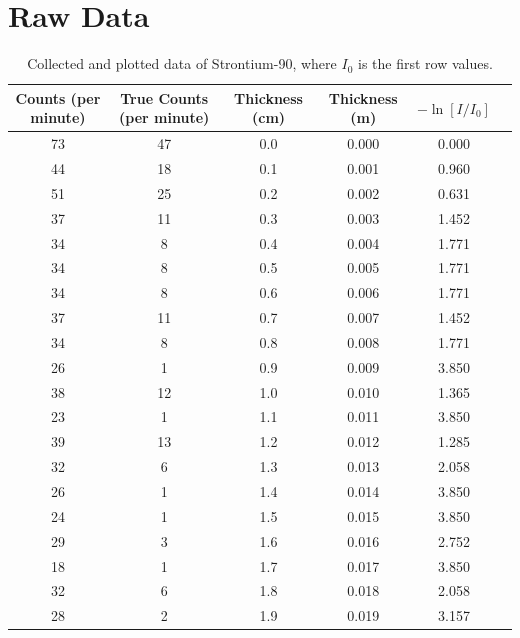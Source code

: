 \documentclass[12pt]{article}
\begin{document}
\section{Raw Data}
\begin{table}[H]
    \centering
    \caption{Collected and plotted data of Strontium-90, where $I_0$ is the first row values.}
    \begin{tabular}{cccccc}
        \toprule
        Counts (per minute) & True Counts (per minute) & Thickness (cm) & Thickness (m) & $-\ln[I/I_0]$ \\
        \midrule
        73 & 47 & 0.0 & 0.000 & 0.000 \\
        44 & 18 & 0.1 & 0.001 & 0.960 \\
        51 & 25 & 0.2 & 0.002 & 0.631 \\
        37 & 11 & 0.3 & 0.003 & 1.452 \\
        34 & 8 & 0.4 & 0.004 & 1.771 \\
        34 & 8 & 0.5 & 0.005 & 1.771 \\
        34 & 8 & 0.6 & 0.006 & 1.771 \\
        37 & 11 & 0.7 & 0.007 & 1.452 \\
        34 & 8 & 0.8 & 0.008 & 1.771 \\
        26 & 1 & 0.9 & 0.009 & 3.850 \\
        38 & 12 & 1.0 & 0.010 & 1.365 \\
        23 & 1 & 1.1 & 0.011 & 3.850 \\
        39 & 13 & 1.2 & 0.012 & 1.285 \\
        32 & 6 & 1.3 & 0.013 & 2.058 \\
        26 & 1 & 1.4 & 0.014 & 3.850 \\
        24 & 1 & 1.5 & 0.015 & 3.850 \\
        29 & 3 & 1.6 & 0.016 & 2.752 \\
        18 & 1 & 1.7 & 0.017 & 3.850 \\
        32 & 6 & 1.8 & 0.018 & 2.058 \\
        28 & 2 & 1.9 & 0.019 & 3.157 \\
        \bottomrule
    \end{tabular}
    \label{tab:rawdata}
\end{table}
\end{document}
